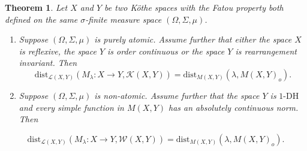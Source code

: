 \documentclass[11pt]{amsart}
\theoremstyle{definition}
\newtheorem{theorem}{Theorem}[section]
\theoremstyle{definition}
\theoremstyle{definition}
\theoremstyle{definition}
\theoremstyle{definition}
\theoremstyle{definition}
\theoremstyle{definition}
\theoremstyle{definition}
\numberwithin{equation}{section}
\numberwithin{equation}{section}
\numberwithin{equation}{section}
\theoremstyle{definition}
\theoremstyle{definition}
\theoremstyle{definition}
\theoremstyle{definition}
\theoremstyle{definition}
\theoremstyle{definition}
\begin{document}
\begin{theorem} \label{Proposition: odleglosci = odleglosci}
	{\it Let $X$ and $Y$ be two K{\" o}the spaces with the Fatou property both defined on the same $\sigma$-finite measure
		space $(\Omega,\Sigma,\mu)$.}
	\begin{enumerate}
		\item [(i)] {\it Suppose $(\Omega,\Sigma,\mu)$ is purely atomic. Assume further that either the space $X$ is reflexive, the space $Y$ is order continuous or the space $Y$ is rearrangement invariant. Then}
		\begin{equation*}
			\text{dist}_{\mathscr{L}(X,Y)}(M_{\lambda} \colon X \rightarrow Y, {\mathscr K}(X,Y)) = \text{dist}_{M(X,Y)}(\lambda, M(X,Y)_o).
		\end{equation*}
		\item [(ii)] {\it Suppose $(\Omega,\Sigma,\mu)$ is non-atomic. Assume further that the space $Y$ is} $1$-DH {\it and every simple
			function in $M(X,Y)$ has an absolutely continuous norm. Then}
	\end{enumerate}
	\begin{equation*}
		\text{dist}_{\mathscr{L}(X,Y)}(M_{\lambda} \colon X \rightarrow Y, {\mathscr W}(X,Y)) = \text{dist}_{M(X,Y)}(\lambda, M(X,Y)_o).
	\end{equation*}
\end{theorem}
\end{document}
